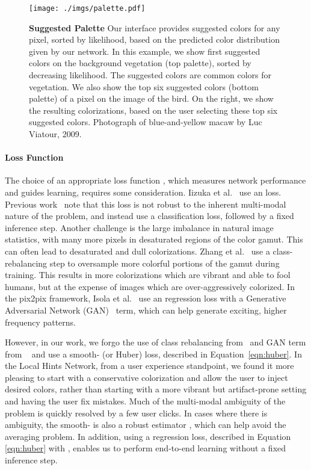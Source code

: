 \documentclass[acmtog,authorversion]{acmart}
\begin{document}
\begin{figure*}[t!]
\centering
\texttt{[image: ./imgs/palette.pdf]}
\caption{\textbf{Suggested Palette} Our interface provides suggested colors for any pixel, sorted by likelihood, based on the predicted color distribution given by our network. In this example, we show first suggested colors on the background vegetation (top palette), sorted by decreasing likelihood. The suggested colors are common colors for vegetation. We also show the top six suggested colors (bottom palette) of a pixel on the image of the bird. On the right, we show the resulting colorizations, based on the user selecting these top six suggested colors. Photograph of blue-and-yellow macaw by Luc Viatour, 2009.}
\vspace{-2mm}
\label{fig:palette}
\end{figure*}

\paragraph{Loss Function} The choice of an appropriate loss function , which measures network performance and guides learning, requires some consideration. Iizuka et al.~ use an  loss. Previous work~\cite{zhang2016colorful,larsson2016learning,charpiat2008automatic} note that this loss is not robust to the inherent multi-modal nature of the problem, and instead use a classification loss, followed by a fixed inference step. Another challenge is the large imbalance in natural image statistics, with many more pixels in desaturated regions of the color gamut. This can often lead to desaturated and dull colorizations. Zhang et al.~ use a class-rebalancing step to oversample more colorful portions of the gamut during training. This results in more colorizations which are vibrant and able to fool humans, but at the expense of images which are over-aggressively colorized. In the pix2pix framework, Isola et al.~ use an  regression loss with a Generative Adversarial Network (GAN)~\cite{goodfellow2014generative} term, which can help generate exciting, higher frequency patterns.

However, in our work, we forgo the use of class rebalancing from~\cite{zhang2016colorful} and GAN term from ~\cite{isola2016image} and use a smooth- (or Huber) loss, described in Equation~\ref{eqn:huber}. In the Local Hints Network, from a user experience standpoint, we found it more pleasing to start with a conservative colorization and allow the user to inject desired colors, rather than starting with a more vibrant but artifact-prone setting and having the user fix mistakes. Much of the multi-modal ambiguity of the problem is quickly resolved by a few user clicks. In cases where there is ambiguity, the smooth- is also a robust estimator \cite{huber1964robust}, which can help avoid the averaging problem. In addition, using a regression loss, described in Equation \ref{eqn:huber} with , enables us to perform end-to-end learning without a fixed inference step.
\end{document}
